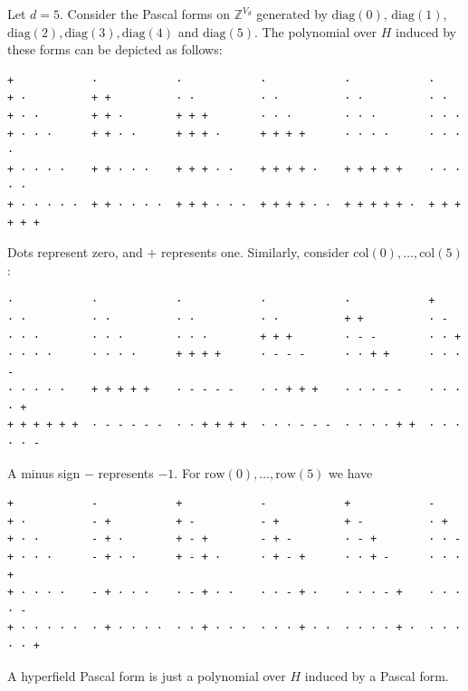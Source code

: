\begin{example}\label{ex:sign-hyperfield03242}
    Let \( d =5 \). Consider the Pascal forms on \( \mathbb{Z}^{V_d} \) generated by \( \mathrm{diag}(0) \), \(\mathrm{diag}(1)\), \(\mathrm{diag}(2), \mathrm{diag}(3), \mathrm{diag}(4) \) and \( \mathrm{diag}(5) \). The polynomial over \( H \) induced by these forms can be depicted as follows:
    \begin{verbatim}
+            ·            ·            ·            ·            ·
+ ·          + +          · ·          · ·          · ·          · ·
+ · ·        + + ·        + + +        · · ·        · · ·        · · ·
+ · · ·      + + · ·      + + + ·      + + + +      · · · ·      · · · ·
+ · · · ·    + + · · ·    + + + · ·    + + + + ·    + + + + +    · · · · ·
+ · · · · ·  + + · · · ·  + + + · · ·  + + + + · ·  + + + + + ·  + + + + + +
    \end{verbatim}
    Dots represent zero, and \( + \) represents one. Similarly, consider \( \mathrm{col}(0), \dots, \mathrm{col}(5) \):
    \begin{verbatim}
·            ·            ·            ·            ·            +
· ·          · ·          · ·          · ·          + +          · -
· · ·        · · ·        · · ·        + + +        · - -        · · +
· · · ·      · · · ·      + + + +      · - - -      · · + +      · · · -
· · · · ·    + + + + +    · - - - -    · · + + +    · · · - -    · · · · +
+ + + + + +  · - - - - -  · · + + + +  · · · - - -  · · · · + +  · · · · · -
    \end{verbatim}
    A minus sign \( - \) represents \( -1 \). For \( \mathrm{row}(0), \dots, \mathrm{row}(5) \) we have
    \begin{verbatim}
+            -            +            -            +            -
+ ·          - +          + -          - +          + -          · +
+ · ·        - + ·        + - +        - + -        · - +        · · -
+ · · ·      - + · ·      + - + ·      · + - +      · · + -      · · · +
+ · · · ·    - + · · ·    · - + · ·    · · - + ·    · · · - +    · · · · -
+ · · · · ·  · + · · · ·  · · + · · ·  · · · + · ·  · · · · + ·  · · · · · +
    \end{verbatim}
\end{example}

\begin{definition}
    A hyperfield Pascal form is just a polynomial over \( H \) induced by a Pascal form.
\end{definition}

